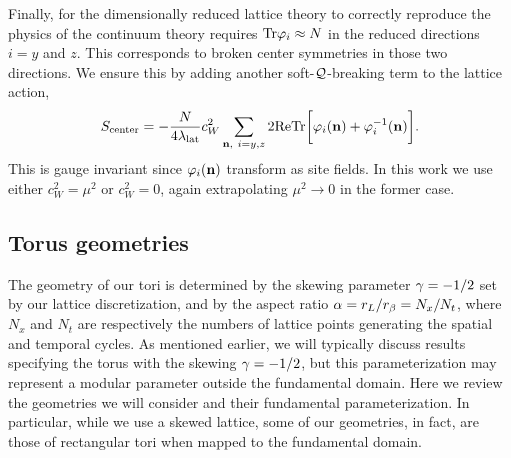 Finally, for the dimensionally reduced lattice theory to correctly reproduce the physics of the continuum theory requires $\mathrm{Tr}{\varphi_i} \approx N$ in the reduced directions $i = y$ and $z$.
This corresponds to broken center symmetries in those two directions.
We ensure this by adding another soft-$\mathcal Q$-breaking term to the lattice action,
\begin{equation}
  \label{eq:center}
  S_{\text{center}} = -\frac{N}{4\lambda_{\text{lat}}} c_W^2 \sum_{\mathbf{n},\ i = y, z} 2\text{ReTr}\bigg[\varphi_i(\mathbf{n}) + \varphi_i^{-1}(\mathbf{n})\bigg].
\end{equation}
This is gauge invariant since $\varphi_i(\mathbf{n})$ transform as site fields.
In this work we use either $c_W^2 = \mu^2$ or $c_W^2 = 0$, again extrapolating $\mu^2 \to 0$ in the former case.

\subsection{\label{sec:torusgeom}Torus geometries}
The geometry of our tori is determined by the skewing parameter $\gamma = -1 / 2$ set by our lattice discretization, and by the aspect ratio $\alpha = r_L / r_{\beta} = N_x / N_t$, where $N_x$ and $N_t$ are respectively the numbers of lattice points generating the spatial and temporal cycles.
As mentioned earlier, we will typically discuss results specifying the torus with the skewing $\gamma = -1 / 2$, but this parameterization may represent a modular parameter outside the fundamental domain.
Here we review the geometries we will consider and their fundamental parameterization.
In particular, while we use a skewed lattice, some of our geometries, in fact, are those of rectangular tori when mapped to the fundamental domain.


